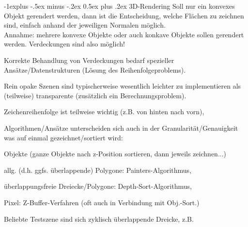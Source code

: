 \documentclass[landscape]{article}
\makeatletter
\renewcommand{\subsection}{\@startsection{subsection}{2}{0mm}%
                                {-1explus -.5ex minus -.2ex}%
                                {0.5ex plus .2ex}%
                                {\normalfont\normalsize\bfseries}}
\makeatother
\begin{document}
\begin{multicols}{3}
  
  \subsection{ 3D-Rendering}
  Soll nur ein konvexes Objekt gerendert werden, dann ist die Entscheidung, welche Flächen zu zeichnen sind, einfach anhand der jeweiligen Normalen möglich.\\
  Annahme: mehrere konvexe Objekte oder auch konkave Objekte sollen gerendert werden. Verdeckungen sind also möglich!
  \begin{itemize*}
    \item Korrekte Behandlung von Verdeckungen bedarf spezieller Ansätze/Datenstrukturen (Lösung des Reihenfolgeproblems).
    \item Rein opake Szenen sind typischerweise wesentlich leichter zu implementieren als (teilweise) transparente (zusätzlich ein Berechnungsproblem).
    \item Zeichenreihenfolge ist teilweise wichtig (z.B. von hinten nach vorn),
    \item Algorithmen/Ansätze unterscheiden sich auch in der Granularität/Genauigkeit was auf einmal gezeichnet/sortiert wird:
    \item Objekte (ganze Objekte nach z-Position sortieren, dann jeweils zeichnen...)
    \item allg. (d.h. ggfs. überlappende) Polygone: Painters-Algorithmus,
    \item überlappungsfreie Dreiecke/Polygone: Depth-Sort-Algorithmus,
    \item Pixel: Z-Buffer-Verfahren (oft auch in Verbindung mit Obj.-Sort.)
    \item Beliebte Testszene sind sich zyklisch überlappende Dreicke, z.B.
  \end{itemize*}
  

\end{multicols}
\end{document}
